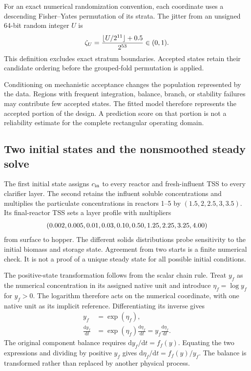 For an exact numerical randomization convention, each coordinate uses a descending Fisher--Yates permutation of its strata. The jitter from an unsigned 64-bit random integer $U$ is
\begin{equation}
\equationname{Conversion of a uniform integer to open-unit jitter}
\zeta_U=\frac{\lfloor U/2^{11}\rfloor+0.5}{2^{53}}\in(0,1).
\end{equation}
This definition excludes exact stratum boundaries. Accepted states retain their candidate ordering before the grouped-fold permutation is applied.

Conditioning on mechanistic acceptance changes the population represented by the data. Regions with frequent integration, balance, branch, or stability failures may contribute few accepted states. The fitted model therefore represents the accepted portion of the design. A prediction score on that portion is not a reliability estimate for the complete rectangular operating domain.

\subsection{Two initial states and the nonsmoothed steady solve}

The first initial state assigns $c_{\rm in}$ to every reactor and fresh-influent TSS to every clarifier layer. The second retains the influent soluble concentrations and multiplies the particulate concentrations in reactors 1--5 by $(1.5,2,2.5,3,3.5)$. Its final-reactor TSS sets a layer profile with multipliers
\begin{equation}
\equationname{Ten-layer initial solids-profile multipliers}
(0.002,0.005,0.01,0.03,0.10,0.50,1.25,2.25,3.25,4.00)
\label{eq:plant_initial_layer_multipliers}
\end{equation}
from surface to hopper. The different solids distributions probe sensitivity to the initial biomass and storage state. Agreement from two starts is a finite numerical check. It is not a proof of a unique steady state for all possible initial conditions.

The positive-state transformation follows from the scalar chain rule. Treat $y_f$ as the numerical concentration in its assigned native unit and introduce $\eta_f=\log y_f$ for $y_f>0$. The logarithm therefore acts on the numerical coordinate, with one native unit as its implicit reference. Differentiating its inverse gives
\[
\begin{aligned}
y_f&=\exp(\eta_f),\\
\frac{\mathrm d y_f}{\mathrm dt}
&=\exp(\eta_f)\frac{\mathrm d\eta_f}{\mathrm dt}
=y_f\frac{\mathrm d\eta_f}{\mathrm dt}.
\end{aligned}
\]
The original component balance requires $\mathrm d y_f/\mathrm dt=f_f(y)$. Equating the two expressions and dividing by positive $y_f$ gives $\mathrm d\eta_f/\mathrm dt=f_f(y)/y_f$. The balance is transformed rather than replaced by another physical process.

